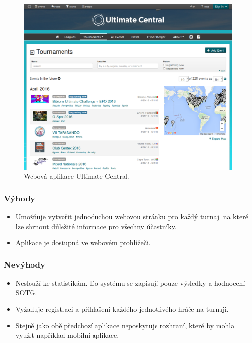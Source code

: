 \begin{figure}[ht!]
\centering
\includegraphics[width=130mm]{./images/ultimate-central.png}
\caption{Webová aplikace Ultimate Central.\label{overflow}}
\label{fig:uwsgi}
\end{figure}

\subsubsection*{Výhody}
\begin{itemize}
  \item Umožňuje vytvořit jednoduchou webovou stránku pro každý turnaj, na které lze shrnout důležité informace pro všechny účastníky.
  \item Aplikace je dostupná ve webovém prohlížeči.
\end{itemize}

\subsubsection*{Nevýhody}
\begin{itemize}
  \item Neslouží ke statistikám. Do systému se zapisují pouze výsledky a hodnocení SOTG.
  \item Vyžaduje registraci a přihlašení každého jednotlivého hráče na turnaji.
  \item Stejně jako obě předchozí aplikace neposkytuje rozhraní, které by mohla využít například mobilní aplikace.
\end{itemize}


